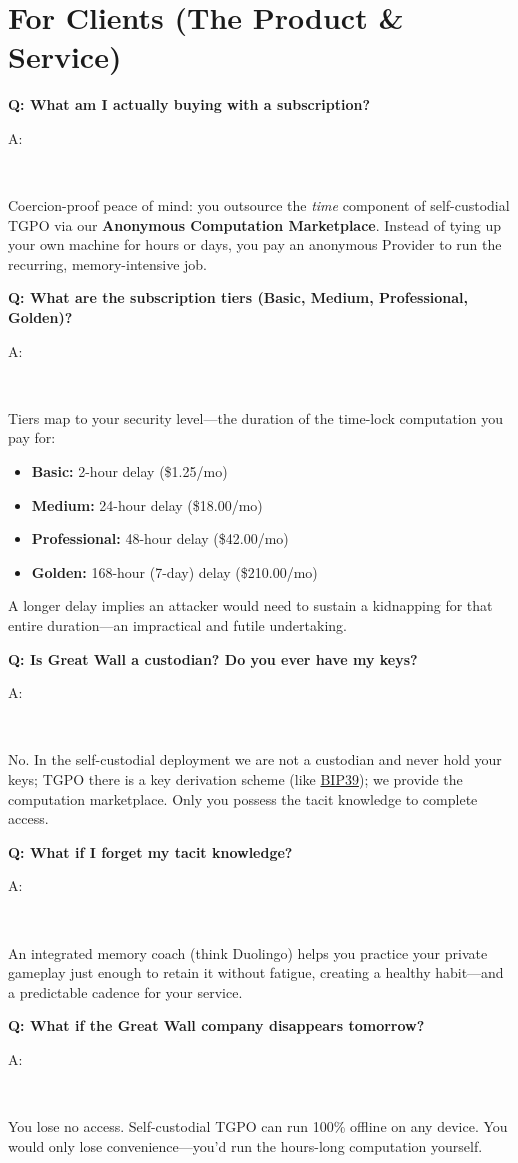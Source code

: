 \documentclass[12pt,a4paper]{article}
\newenvironment{question}[1]{%
  \vspace{0.8em}\noindent\textbf{Q: #1}\par
  \vspace{0.2em}\noindent\begin{itshape}A:\end{itshape}~%
}{\vspace{0.8em}}
\begin{document}
\section{For Clients (The Product \& Service)}

\begin{question}{What am I actually buying with a subscription?}
Coercion-proof peace of mind: you outsource the \emph{time} component of self-custodial TGPO via our \textbf{Anonymous Computation Marketplace}. Instead of tying up your own machine for hours or days, you pay an anonymous Provider to run the recurring, memory-intensive job.
\end{question}

\begin{question}{What are the subscription tiers (Basic, Medium, Professional, Golden)?}
Tiers map to your security level—the duration of the time-lock computation you pay for:
\begin{itemize}
  \item \textbf{Basic:} 2-hour delay (\$1.25/mo)
  \item \textbf{Medium:} 24-hour delay (\$18.00/mo)
  \item \textbf{Professional:} 48-hour delay (\$42.00/mo)
  \item \textbf{Golden:} 168-hour (7-day) delay (\$210.00/mo)
\end{itemize}
A longer delay implies an attacker would need to sustain a kidnapping for that entire duration—an impractical and futile undertaking.
\end{question}

\begin{question}{Is Great Wall a custodian? Do you ever have my keys?}
No. In the self-custodial deployment we are not a custodian and never hold your keys; TGPO there is a key derivation scheme (like \href{https://github.com/bitcoin/bips/blob/master/bip-0039.mediawiki}{BIP39}); we provide the computation marketplace. Only you possess the tacit knowledge to complete access.
\end{question}

\begin{question}{What if I forget my tacit knowledge?}
An integrated memory coach (think Duolingo) helps you practice your private gameplay just enough to retain it without fatigue, creating a healthy habit—and a predictable cadence for your service.
\end{question}

\begin{question}{What if the Great Wall company disappears tomorrow?}
You lose no access. Self-custodial TGPO can run 100\% offline on any device. You would only lose convenience—you'd run the hours-long computation yourself.
\end{question}
\end{document}

